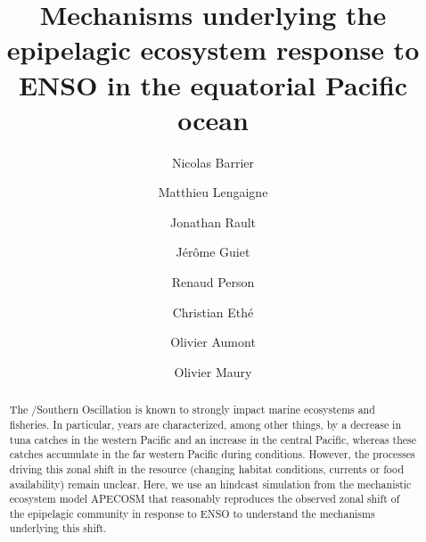 \documentclass[review, 12pt]{elsarticle}
\begin{document}
\begin{frontmatter}

\title{Mechanisms underlying the epipelagic ecosystem response to ENSO in the equatorial Pacific ocean}

\author[mymainaddress]{Nicolas Barrier}

\author[mymainaddress]{Matthieu Lengaigne}
\author[mymainaddress]{Jonathan Rault}
\author[jerome]{J\'{e}r\^{o}me Guiet}
\author[renaud]{Renaud Person}
\author[chris]{Christian Eth\'{e}}
\author[renaud]{Olivier Aumont}
\author[mymainaddress]{Olivier Maury}


\address[mymainaddress]{MARBEC, Univ. Montpellier, CNRS, Ifremer, IRD, Sète, France}
\address[renaud]{LOCEAN, IRD}
\address[chris]{IPSL, CNRS}
\address[jerome]{Department of Atmospheric and Oceanic Sciences, University of California, Los Angeles}

\begin{abstract}

The \nino{}/Southern Oscillation is known to strongly impact marine ecosystems and fisheries. In particular, \nino{} years are characterized, among other things, by a decrease in tuna catches in the western Pacific and an increase in the central Pacific, whereas these catches accumulate in the far western Pacific during \nina{} conditions. However, the processes driving this zonal shift in the resource (changing habitat conditions, currents or food availability) remain unclear. Here, we use an hindcast simulation from the mechanistic ecosystem model APECOSM that reasonably reproduces the observed zonal shift of the epipelagic community in response to ENSO to understand the mechanisms underlying this shift.



\end{abstract}
\end{frontmatter}
\end{document}
